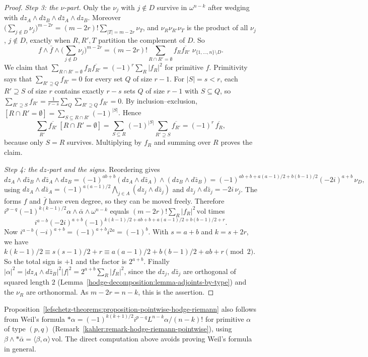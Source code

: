 \begin{proof}
\emph{Step 3: the $\nu$-part.} Only the $\nu_j$ with $j \notin D$ survive in $\omega^{n-k}$ after wedging with $dz_A \wedge d\bar z_B \wedge d\bar z_A \wedge dz_B$.
Moreover $\big(\sum_{j \notin D}\nu_j\big)^{m-2r} = (m-2r)!\sum_{|T|=m-2r}\nu_T$, and $\nu_R\nu_{R'}\nu_T$ is the product of all $\nu_j$, $j \notin D$, exactly
when $R, R', T$ partition the complement of $D$. So
\[
f \wedge \bar f \wedge \Big(\sum_{j \notin D}\nu_j\Big)^{m-2r} = (m-2r)!\sum_{R \cap R' = \emptyset}f_R\overline{f_{R'}}\;\nu_{\{1, \ldots, n\} \setminus D}.
\]
We claim that $\sum_{R \cap R' = \emptyset}f_R\overline{f_{R'}} = (-1)^r\sum_R|f_R|^2$ for primitive $f$. Primitivity says that
$\sum_{R' \supseteq Q}f_{R'} = 0$ for every set $Q$ of size $r - 1$. For $|S| = s < r$, each $R' \supseteq S$ of size $r$ contains exactly $r - s$ sets
$Q$ of size $r - 1$ with $S \subseteq Q$, so $\sum_{R' \supseteq S}f_{R'} = \frac{1}{r-s}\sum_Q\sum_{R' \supseteq Q}f_{R'} = 0$. By
inclusion--exclusion, $[R \cap R' = \emptyset] = \sum_{S \subseteq R \cap R'}(-1)^{|S|}$. Hence
\[
\sum_{R'}\overline{f_{R'}}\,[R \cap R' = \emptyset] = \sum_{S \subseteq R}(-1)^{|S|}\sum_{R' \supseteq S}\overline{f_{R'}} = (-1)^r\,\overline{f_R},
\]
because only $S = R$ survives. Multiplying by $f_R$ and summing over $R$ proves the claim.

\emph{Step 4: the $dz$-part and the signs.} Reordering gives
\[
dz_A \wedge d\bar z_B \wedge d\bar z_A \wedge dz_B = (-1)^{ab + b}(dz_A \wedge d\bar z_A) \wedge (dz_B \wedge d\bar z_B)
= (-1)^{ab + b + a(a-1)/2 + b(b-1)/2}(-2i)^{a+b}\,\nu_D,
\]
using $dz_A \wedge d\bar z_A = (-1)^{a(a-1)/2}\bigwedge_{j \in A}(dz_j \wedge d\bar z_j)$ and $dz_j \wedge d\bar z_j = -2i\,\nu_j$. The forms $f$ and $\bar f$
have even degree, so they can be moved freely. Therefore $i^{p-q}(-1)^{k(k-1)/2}\alpha \wedge \bar\alpha \wedge \omega^{n-k}$ equals
$(m-2r)!\sum_R|f_R|^2\,\mathrm{vol}$ times
\[
i^{a-b}(-2i)^{a+b}(-1)^{k(k-1)/2 + ab + b + a(a-1)/2 + b(b-1)/2 + r} .
\]
Now $i^{a-b}(-i)^{a+b} = (-1)^{a+b}i^{2a} = (-1)^b$. With $s = a + b$ and $k = s + 2r$, we have
$k(k-1)/2 \equiv s(s-1)/2 + r \equiv a(a-1)/2 + b(b-1)/2 + ab + r \pmod 2$. So the total sign is $+1$ and the factor is $2^{a+b}$. Finally
$|\alpha|^2 = |dz_A \wedge d\bar z_B|^2|f|^2 = 2^{a+b}\sum_R|f_R|^2$, since the $dz_j$, $d\bar z_j$ are orthogonal of squared length $2$
(Lemma~\ref{hodge-decomposition:lemma-adjoints-by-type}) and the $\nu_R$ are orthonormal. As $m - 2r = n - k$, this is the assertion.
\end{proof}

\begin{remark}\label{lefschetz-theorems:remark-weil-formula}
Proposition~\ref{lefschetz-theorems:proposition-pointwise-hodge-riemann} also follows from Weil's formula
$*\alpha = (-1)^{k(k+1)/2}i^{p-q}L^{n-k}\alpha/(n-k)!$ for primitive $\alpha$ of type $(p,q)$ (Remark~\ref{kahler:remark-hodge-riemann-pointwise}),
using $\beta \wedge *\bar\alpha = \langle\beta, \alpha\rangle\,\mathrm{vol}$. The direct computation above avoids proving Weil's formula in
general.
\end{remark}

